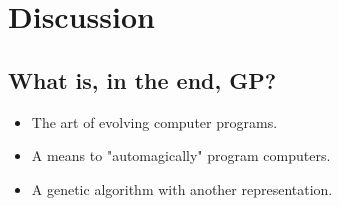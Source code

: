 \section{Discussion}
\subsection*{What is, in the end, GP?}
\begin{itemize}
    \item  The art of evolving computer programs.
    \item A means to "automagically" program computers.
    \item  A genetic algorithm with another representation.
\end{itemize}

